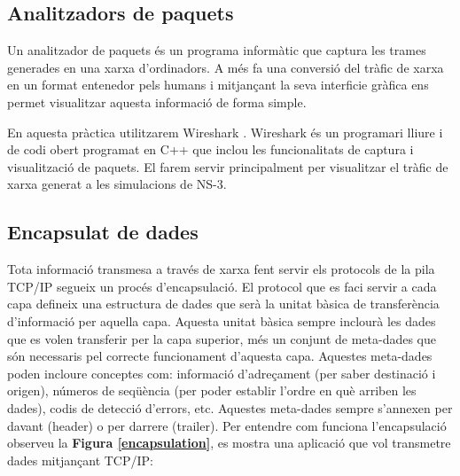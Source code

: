 \documentclass[12pt,a4paper]{article}
\begin{document}

\subsection*{Analitzadors de paquets}
Un analitzador de paquets és un programa informàtic que captura les trames generades en una xarxa d'ordinadors. A més fa una conversió del tràfic de xarxa en un format entenedor pels humans i mitjançant la seva interficie gràfica  ens permet visualitzar aquesta informació de forma simple.

En aquesta pràctica utilitzarem Wireshark \cite{wireshark}. Wireshark és un programari lliure i de codi obert programat en C++ que inclou les funcionalitats de captura i visualització de paquets. El farem servir principalment per visualitzar el tràfic de xarxa generat a les simulacions de NS-3.

\subsection*{Encapsulat de dades}

Tota informació transmesa a través de xarxa fent servir els protocols de la pila TCP/IP segueix un procés d'encapsulació. El protocol que es faci servir a cada capa defineix una estructura de dades que serà la unitat bàsica de transferència d'informació per aquella capa. Aquesta unitat bàsica sempre inclourà les dades que es volen transferir per la capa superior, més un conjunt de meta-dades que són necessaris pel correcte funcionament d'aquesta capa. Aquestes meta-dades poden incloure conceptes com: informació d'adreçament (per saber destinació i origen), números de seqüència (per poder establir l'ordre en què arriben les dades), codis de detecció d'errors, etc. Aquestes meta-dades sempre s'annexen per davant (header) o per darrere (trailer). Per entendre com funciona l'encapsulació observeu la \textbf{Figura \ref{encapsulation}}, es mostra una aplicació que vol transmetre dades mitjançant TCP/IP:
\end{document}
